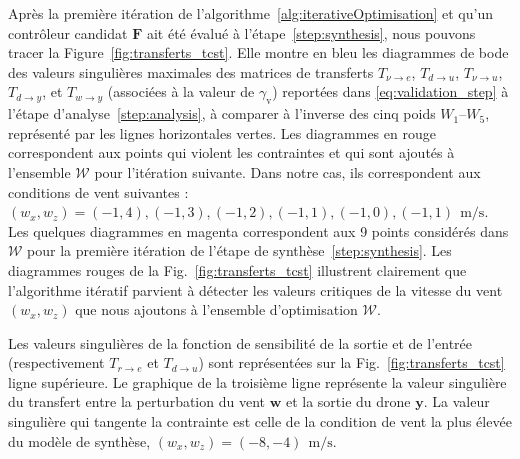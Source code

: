 Après la première itération de l'algorithme~\ref{alg:iterativeOptimisation} et qu'un contrôleur candidat $\boldsymbol{F}$ ait été évalué à l'étape~\ref{step:synthesis}, nous pouvons tracer la Figure~\ref{fig:transferts_tcst}. Elle montre en bleu les diagrammes de bode des valeurs singulières maximales des matrices de transferts $T_{\nu \rightarrow e}$, $T_{d \rightarrow u}$, $T_{\nu \rightarrow u}$, $T_{d \rightarrow y}$, et $T_{w \rightarrow y}$ (associées à la valeur de $\gamma_{\text{v}}$) reportées dans \eqref{eq:validation_step} à l'étape d'analyse~\ref{step:analysis}, à comparer à l'inverse des cinq poids $W_1$--$W_5$, représenté par les lignes horizontales vertes. 
Les diagrammes en rouge correspondent aux points qui violent les contraintes et qui sont ajoutés à l'ensemble ${\mathcal W}$ pour l'itération suivante. Dans notre cas, ils correspondent aux conditions de vent suivantes : $(w_x, w_z) = {(-1, 4), (-1, 3), (-1, 2), (-1, 1), (-1, 0), (-1, 1)} ~\SI{}{\meter\per\second}$. Les quelques diagrammes en magenta correspondent aux 9 points considérés dans ${\mathcal W}$ pour la première itération de l'étape de synthèse~\ref{step:synthesis}.
Les diagrammes rouges de la Fig.~\ref{fig:transferts_tcst} illustrent clairement que l'algorithme itératif parvient à détecter les valeurs critiques de la vitesse du vent $(w_x,w_z)$ que nous ajoutons à l'ensemble d'optimisation ${\mathcal W}$.

Les valeurs singulières de la fonction de sensibilité de la sortie et de l'entrée (respectivement $T_{r \rightarrow e}$ et $T_{d \rightarrow u}$) sont représentées sur la Fig.~\ref{fig:transferts_tcst} ligne supérieure. Le graphique de la troisième ligne représente la valeur singulière du transfert entre la perturbation du vent $\boldsymbol{w}$ et la sortie du drone $\boldsymbol{y}$. La valeur singulière qui tangente la contrainte est celle de la condition de vent la plus élevée du modèle de synthèse, $(w_x, w_z) = (-8,-4)~\SI{}{\meter\per\second}$.

